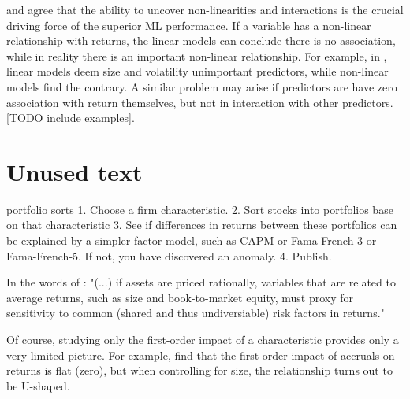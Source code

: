 		\cite{bryzgalova2019forest} and \cite{gu2020empirical} agree that the ability to uncover non-linearities and interactions is the crucial driving force of the superior ML performance.  If a variable has a non-linear relationship with returns, the linear models can conclude there is no association, while in reality there is an important non-linear relationship. For example, in \cite{gu2020empirical}, linear models deem size and volatility unimportant predictors, while non-linear models find the contrary. A similar problem may arise if predictors are have zero association with return themselves, but not in interaction with other predictors. [TODO include examples]. 
    
	

	\section{Unused text}
		portfolio sorts
				1. Choose a firm characteristic. 
				2. Sort stocks into portfolios base on that characteristic \citep{fama1993common}
				3. See if differences in returns between these portfolios can be explained by a simpler factor model, such as CAPM or Fama-French-3 or Fama-French-5. If not, you have discovered an anomaly. 
				4. Publish.

	
	   		In the words of \cite{fama1993common}: "(...) if assets are priced rationally, variables that are
	   related to average returns, such as size and book-to-market equity, must proxy for
	   sensitivity to common (shared and thus undiversiable) risk factors in returns." 
	   
	   		Of course, studying only the first-order impact of a characteristic provides only a very limited picture. For example, \cite{bryzgalova2019forest} find that the first-order impact of accruals on returns is flat (zero), but when controlling for size, the relationship turns out to be U-shaped. 
	



